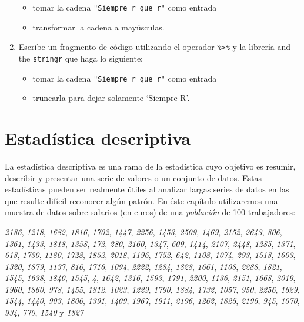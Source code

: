 \documentclass[
]{book}
\providecommand{\tightlist}{%
  \setlength{\itemsep}{0pt}\setlength{\parskip}{0pt}}
\begin{document}
\begin{enumerate}
  \begin{itemize}
  \tightlist
  \item
    tomar la cadena \texttt{"Siempre\ r\ que\ r"} como entrada
  \item
    transformar la cadena a mayúsculas.
  \end{itemize}
\item
  Escribe un fragmento de código utilizando el operador \texttt{\%\textgreater{}\%} y la librería and the \texttt{stringr} que haga lo siguiente:

  \begin{itemize}
  \tightlist
  \item
    tomar la cadena \texttt{"Siempre\ r\ que\ r"} como entrada
  \item
    truncarla para dejar solamente `Siempre R'.
  \end{itemize}
\end{enumerate}

\hypertarget{estaduxedstica-descriptiva}{%
\chapter{Estadística descriptiva}\label{estaduxedstica-descriptiva}}

La estadística descriptiva es una rama de la estadística cuyo objetivo es resumir, describir y presentar una serie de valores o un conjunto de datos. Estas estadísticas pueden ser realmente útiles al analizar largas series de datos en las que resulte difícil reconocer algún patrón. En éste capítulo utilizaremos una muestra de datos sobre salarios (en euros) de una \emph{población} de 100 trabajadores:

\emph{2186}, \emph{1218}, \emph{1682}, \emph{1816}, \emph{1702}, \emph{1447}, \emph{2256}, \emph{1453}, \emph{2509}, \emph{1469}, \emph{2152}, \emph{2643}, \emph{806}, \emph{1361}, \emph{1433}, \emph{1818}, \emph{1358}, \emph{172}, \emph{280}, \emph{2160}, \emph{1347}, \emph{609}, \emph{1414}, \emph{2107}, \emph{2448}, \emph{1285}, \emph{1371}, \emph{618}, \emph{1730}, \emph{1180}, \emph{1728}, \emph{1852}, \emph{2018}, \emph{1196}, \emph{1752}, \emph{642}, \emph{1108}, \emph{1074}, \emph{293}, \emph{1518}, \emph{1603}, \emph{1320}, \emph{1879}, \emph{1137}, \emph{816}, \emph{1716}, \emph{1094}, \emph{2222}, \emph{1284}, \emph{1828}, \emph{1661}, \emph{1108}, \emph{2288}, \emph{1821}, \emph{1545}, \emph{1638}, \emph{1840}, \emph{1545}, \emph{4}, \emph{1642}, \emph{1316}, \emph{1593}, \emph{1791}, \emph{2200}, \emph{1136}, \emph{2151}, \emph{1668}, \emph{2019}, \emph{1960}, \emph{1860}, \emph{978}, \emph{1455}, \emph{1812}, \emph{1023}, \emph{1229}, \emph{1790}, \emph{1884}, \emph{1732}, \emph{1057}, \emph{950}, \emph{2256}, \emph{1629}, \emph{1544}, \emph{1440}, \emph{903}, \emph{1806}, \emph{1391}, \emph{1409}, \emph{1967}, \emph{1911}, \emph{2196}, \emph{1262}, \emph{1825}, \emph{2196}, \emph{945}, \emph{1070}, \emph{934}, \emph{770}, \emph{1540} y \emph{1827}
\end{document}
